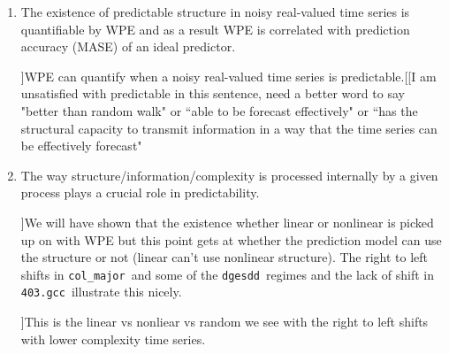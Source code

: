 \documentclass{article}
\newcommand{\gcc}{{\tt 403.gcc}~}
\newcommand{\svd}{{\tt dgesdd}~}
\newcommand{\col}{{\tt col\_major}~}
\begin{document}
\begin{enumerate}

\item The existence of predictable structure in noisy real-valued time series is quantifiable by WPE and as a result WPE is correlated with prediction accuracy (MASE) of an ideal predictor. 

\subitem [[Simply reminders not to be included]]WPE can quantify when a noisy real-valued time series is predictable.[[I am unsatisfied with predictable in this sentence, need a better word to say "better than random walk" or ``able to be forecast effectively" or ``has the structural capacity to transmit information in a way that the time series can be effectively forecast"


\item The way structure/information/complexity is processed internally by a given process plays a crucial role in predictability.


\subitem [[Simply reminders not to be included]]We will have shown that the existence whether linear or nonlinear is picked up on with WPE but this point gets at whether the prediction model can use the structure or not (linear can't use nonlinear structure). The right to left shifts in \col and some of the \svd regimes and the lack of shift in \gcc illustrate this nicely.

\subitem [[Simply reminders not to be included]]This is the linear vs nonliear vs random we see with the right to left shifts with lower complexity time series. 

 
\end{enumerate}








\end{document}

